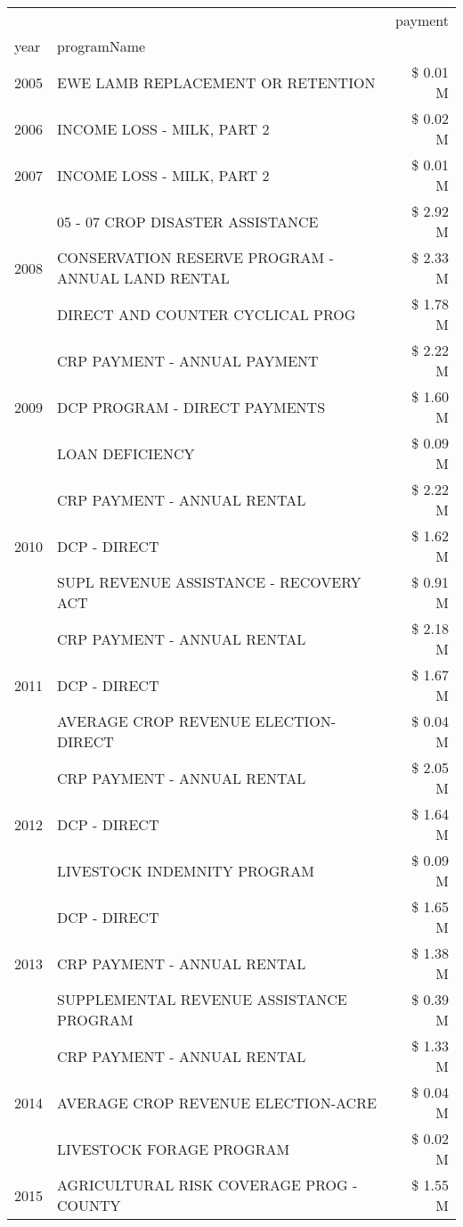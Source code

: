 \begin{tabular}{llr}
\toprule
 &  & payment \\
year & programName &  \\
\midrule
2005 & EWE LAMB REPLACEMENT OR RETENTION & \$ 0.01 M \\
\cline{1-3}
2006 & INCOME LOSS - MILK, PART 2 & \$ 0.02 M \\
\cline{1-3}
2007 & INCOME LOSS - MILK, PART 2 & \$ 0.01 M \\
\cline{1-3}
\multirow[t]{3}{*}{2008} & 05 - 07 CROP DISASTER ASSISTANCE & \$ 2.92 M \\
 & CONSERVATION RESERVE PROGRAM - ANNUAL LAND RENTAL & \$ 2.33 M \\
 & DIRECT AND COUNTER CYCLICAL PROG & \$ 1.78 M \\
\cline{1-3}
\multirow[t]{3}{*}{2009} & CRP PAYMENT - ANNUAL PAYMENT & \$ 2.22 M \\
 & DCP PROGRAM - DIRECT PAYMENTS & \$ 1.60 M \\
 & LOAN DEFICIENCY & \$ 0.09 M \\
\cline{1-3}
\multirow[t]{3}{*}{2010} & CRP PAYMENT - ANNUAL RENTAL & \$ 2.22 M \\
 & DCP - DIRECT & \$ 1.62 M \\
 & SUPL REVENUE ASSISTANCE - RECOVERY ACT & \$ 0.91 M \\
\cline{1-3}
\multirow[t]{3}{*}{2011} & CRP PAYMENT - ANNUAL RENTAL & \$ 2.18 M \\
 & DCP - DIRECT & \$ 1.67 M \\
 & AVERAGE CROP REVENUE ELECTION-DIRECT & \$ 0.04 M \\
\cline{1-3}
\multirow[t]{3}{*}{2012} & CRP PAYMENT - ANNUAL RENTAL & \$ 2.05 M \\
 & DCP - DIRECT & \$ 1.64 M \\
 & LIVESTOCK INDEMNITY PROGRAM & \$ 0.09 M \\
\cline{1-3}
\multirow[t]{3}{*}{2013} & DCP - DIRECT & \$ 1.65 M \\
 & CRP PAYMENT - ANNUAL RENTAL & \$ 1.38 M \\
 & SUPPLEMENTAL REVENUE ASSISTANCE PROGRAM & \$ 0.39 M \\
\cline{1-3}
\multirow[t]{3}{*}{2014} & CRP PAYMENT - ANNUAL RENTAL & \$ 1.33 M \\
 & AVERAGE CROP REVENUE ELECTION-ACRE & \$ 0.04 M \\
 & LIVESTOCK FORAGE PROGRAM & \$ 0.02 M \\
\cline{1-3}
\multirow[t]{3}{*}{2015} & AGRICULTURAL RISK COVERAGE PROG - COUNTY & \$ 1.55 M \\

\end{tabular}
